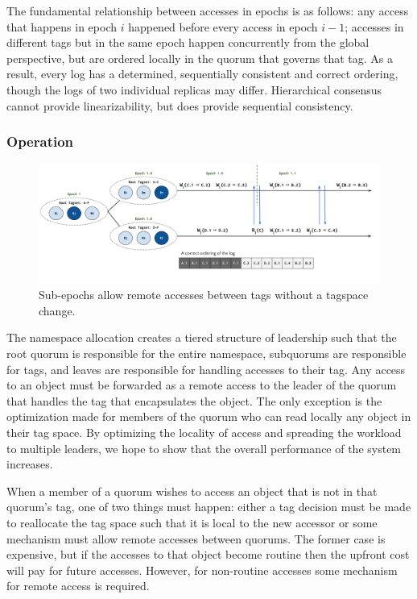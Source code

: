 \documentclass{article}
\begin{document}
The fundamental relationship between accesses in epochs is as follows: any access that happens in epoch $i$ happened before every access in epoch $i-1$; accesses in different tags but in the same epoch happen concurrently from the global perspective, but are ordered locally in the quorum that governs that tag. As a result, every log has a determined, sequentially consistent and correct ordering, though the logs of two individual replicas may differ. Hierarchical consensus cannot provide linearizability, but does provide sequential consistency.

\subsubsection{Operation}

\begin{figure}
    \centering
        \includegraphics[width=.9\textwidth]{figures/subepoch}
        \caption{Sub-epochs allow remote accesses between tags without a tagspace change.}
        \label{fig:subepoch}
\end{figure}

The namespace allocation creates a tiered structure of leadership such that the root quorum is responsible for the entire namespace, subquorums are responsible for tags, and leaves are responsible for handling accesses to their tag. Any access to an object must be forwarded as a remote access to the leader of the quorum that handles the tag that encapsulates the object. The only exception is the optimization made for members of the quorum who can read locally any object in their tag space. By optimizing the locality of access and spreading the workload to multiple leaders, we hope to show that the overall performance of the system increases.

When a member of a quorum wishes to access an object that is not in that quorum's tag, one of two things must happen: either a tag decision must be made to reallocate the tag space such that it is local to the new accessor or some mechanism must allow remote accesses between quorums. The former case is expensive, but if the accesses to that object become routine then the upfront cost will pay for future accesses. However, for non-routine accesses some mechanism for remote access is required.
\end{document}
